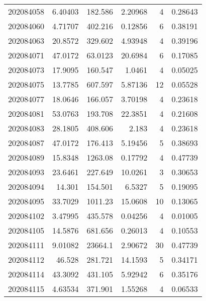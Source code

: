 \begin{tabular}{rrrrrr}
 202084058 &          6.40403 &      182.586  &            2.20968 &           4 & 0.28643 \\
 202084060 &          4.71707 &      402.216  &            0.12856 &           6 & 0.38191 \\
 202084063 &         20.8572  &      329.602  &            4.93948 &           4 & 0.39196 \\
 202084071 &         47.0172  &       63.0123 &           20.6984  &           6 & 0.17085 \\
 202084073 &         17.9095  &      160.547  &            1.0461  &           4 & 0.05025 \\
 202084075 &         13.7785  &      607.597  &            5.87136 &          12 & 0.05528 \\
 202084077 &         18.0646  &      166.057  &            3.70198 &           4 & 0.23618 \\
 202084081 &         53.0763  &      193.708  &           22.3851  &           4 & 0.21608 \\
 202084083 &         28.1805  &      408.606  &            2.183   &           4 & 0.23618 \\
 202084087 &         47.0172  &      176.413  &            5.19456 &           5 & 0.38693 \\
 202084089 &         15.8348  &     1263.08   &            0.17792 &           4 & 0.47739 \\
 202084093 &         23.6461  &      227.649  &           10.0261  &           3 & 0.30653 \\
 202084094 &         14.301   &      154.501  &            6.5327  &           5 & 0.19095 \\
 202084095 &         33.7029  &     1011.23   &           15.0608  &          10 & 0.13065 \\
 202084102 &          3.47995 &      435.578  &            0.04256 &           4 & 0.01005 \\
 202084105 &         14.5876  &      681.656  &            0.26013 &           4 & 0.10553 \\
 202084111 &          9.01082 &    23664.1    &            2.90672 &          30 & 0.47739 \\
 202084112 &         46.528   &      281.721  &           14.1593  &           5 & 0.34171 \\
 202084114 &         43.3092  &      431.105  &            5.92942 &           6 & 0.35176 \\
 202084115 &          4.63534 &      371.901  &            1.55268 &           4 & 0.06533 \\

\end{tabular}
